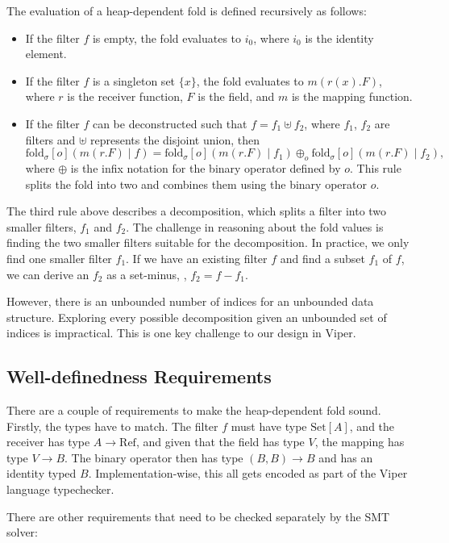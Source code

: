 \documentclass[msc,oneside]{ubcthesis}
\theoremstyle{definition}
\begin{document}
The evaluation of a heap-dependent fold is defined recursively as follows:
\begin{itemize}
    \item If the filter $f$ is empty, the fold evaluates to $i_0$, where $i_0$ is the identity element.
    \item If the filter $f$ is a singleton set $\{x\}$, the fold evaluates to $m(r(x).F)$, where $r$ is the receiver function, $F$ is the field, and $m$ is the mapping function.
    \item If the filter $f$ can be deconstructed such that $f = f_1 \uplus f_2$, where $f_1$, $f_2$ are filters and $\uplus$ represents the disjoint union, then  $$\textrm{fold}_{\sigma}[o]( m(r.F) \mid f)  = \textrm{fold}_{\sigma}[o]( m(r.F) \mid f_1)  \oplus_o \textrm{fold}_{\sigma}[o]( m(r.F) \mid f_2),$$ where $\oplus$ is the infix notation for the binary operator defined by $o$. This rule splits the fold into two and combines them using the binary operator $o$.
\end{itemize}

The third rule above describes a decomposition, which splits a filter into two smaller filters, $f_1$ and $f_2$. The challenge in reasoning about the fold values is finding the two smaller filters suitable for the decomposition. In practice, we only find one smaller filter $f_1$. If we have an existing filter $f$ and find a subset $f_1$ of $f$, we can derive an $f_2$ as a set-minus, \ie, $f_2 = f - f_1$. 

However, there is an unbounded number of indices for an unbounded data structure. Exploring every possible decomposition given an unbounded set of indices is impractical. This is one key challenge to our design in Viper.

\subsection{Well-definedness Requirements}
There are a couple of requirements to make the heap-dependent fold sound. Firstly, the types have to match. The filter $f$ must have type $\textrm{Set}[A]$, and the receiver has type $A \rightarrow \textrm{Ref}$, and given that the field has type $V$, the mapping has type $V \rightarrow B$. The binary operator then has type $(B, B) \rightarrow B$ and has an identity typed $B$. Implementation-wise, this all gets encoded as part of the Viper language typechecker. 

There are other requirements that need to be checked separately by the SMT solver:
\end{document}
